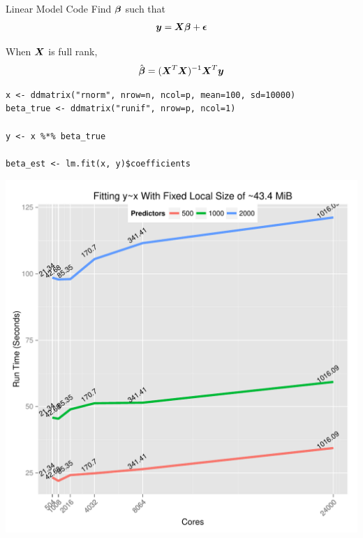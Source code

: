 \begin{frame}[fragile]
  \begin{block}{Linear Model Code}
      Find $\boldsymbol{\beta}$ such that
      \begin{align*}
      \boldsymbol{y} = \boldsymbol{X}\boldsymbol{\beta} + \boldsymbol{\epsilon}
      \end{align*}

      When $\boldsymbol{X}$ is full rank,
      \begin{align*}
      \hat{\boldsymbol{\beta}} = (\boldsymbol{X}^T\boldsymbol{X})^{-1}\boldsymbol{X}^T\boldsymbol{y} \label{math:ols}
      \end{align*}
\begin{lstlisting}
x <- ddmatrix("rnorm", nrow=n, ncol=p, mean=100, sd=10000)
beta_true <- ddmatrix("runif", nrow=p, ncol=1)

y <- x %*% beta_true

beta_est <- lm.fit(x, y)$coefficients
\end{lstlisting}  %
  \end{block}
\end{frame}

\begin{frame}
  \begin{block}{}
  \begin{center}
    \includegraphics[height=.88\textheight]{../common/pics/benchmarks/lmfit2}
  \end{center}
  \end{block}
\end{frame}

